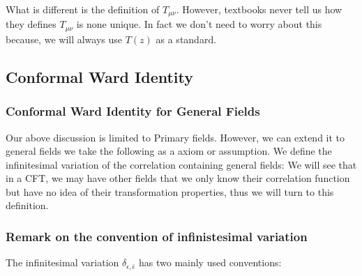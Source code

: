What is different is the definition of $ T_{\mu\nu} $. However, textbooks never tell us how they defines $ T_{\mu\nu} $ is none unique. In fact we don't need to worry about this because, we will always use $ T(z) $ as a standard.



\subsection{Conformal Ward Identity}

\subsubsection{Conformal Ward Identity for General Fields}

Our above discussion is limited to Primary fields. However, we can extend it to general fields we take the following as a axiom or assumption. We define the infinitesimal variation of the correlation containing general fields:
We will see that in a CFT, we may have other fields that we only know their correlation function but have no idea of their transformation properties, thus we will turn to this definition.
\subsubsection{Remark on the convention of infinistesimal variation}

The infinitesimal variation $ \delta_{\epsilon,\bar{\epsilon}}$ has two mainly used conventions:

